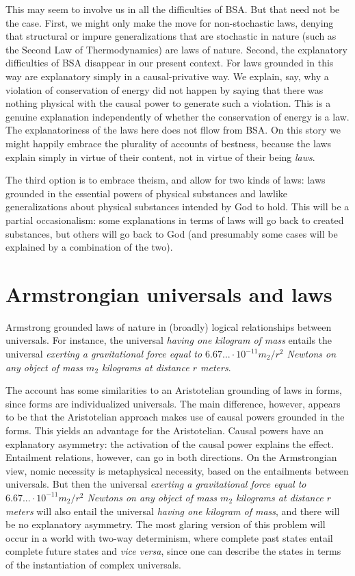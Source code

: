 This may seem to involve us in all the difficulties of BSA. But that need not be the case. First, we might only make the move for
non-stochastic laws, denying that structural or impure generalizations that are stochastic in nature (such as the Second Law of 
Thermodynamics) are laws of nature. Second, the explanatory difficulties of BSA disappear in our present context. For 
laws grounded in this way are explanatory simply in a causal-privative way. We explain, say, why a violation of 
conservation of energy did not happen by saying that there was nothing physical with the causal power to generate such a 
violation. This is a genuine explanation independently of whether the conservation of energy is a law. The
explanatoriness of the laws here does not fllow from BSA. On this story we might happily embrace the plurality of accounts of
bestness, because the laws explain simply in virtue of their content, not in virtue of their being \textit{laws}.

The third option is to embrace theism, and allow for two kinds of laws: laws grounded in the essential powers of physical substances
and lawlike generalizations about physical substances intended by God to hold. This will be a partial occasionalism: some explanations
in terms of laws will go back to created substances, but others will go back to God (and presumably some cases will be explained by
a combination of the two). 

\section{Armstrongian universals and laws}
Armstrong grounded laws of nature in (broadly) logical relationships between universals. For instance, the universal
\textit{having one kilogram of mass} entails the universal \textit{exerting a gravitational
force equal to $6.67... \cdot 10^{-11} m_2/r^2$ Newtons on any object of mass $m_2$ kilograms at 
distance $r$ meters}. 

The account has some similarities to an Aristotelian grounding of laws in 
forms, since forms are individualized universals. The main difference, however, appears to be that the Aristotelian
approach makes use of causal powers grounded in the forms. This yields an advantage for the Aristotelian.
Causal powers have an explanatory asymmetry: the activation of the causal power explains the effect. 
Entailment relations, however, can go in both directions. On the Armstrongian view, nomic necessity is 
metaphysical necessity, based on the entailments between universals. But then the universal \textit{exerting a gravitational
force equal to $6.67... \cdot 10^{-11} m_2/r^2$ Newtons on any object of mass $m_2$ kilograms at 
distance $r$ meters} will also entail the universal \textit{having one kilogram of mass}, and there will be no 
explanatory asymmetry. The most glaring version of this problem will occur in a world with two-way determinism, where 
complete past states entail complete future states and \textit{vice versa}, since one can describe the states in terms of 
the instantiation of complex universals. 

